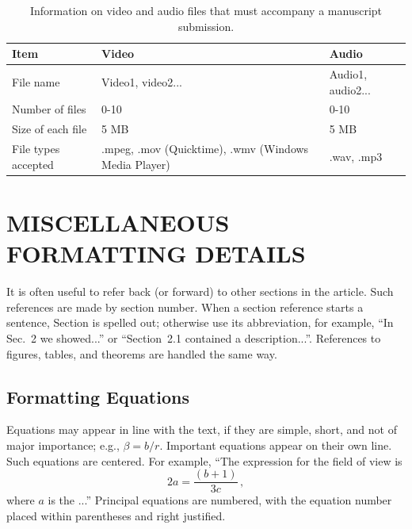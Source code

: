 \documentclass[]{spie}  %
\begin{document}
   \begin{table}[ht]
\caption{Information on video and audio files that must accompany a manuscript submission.} 
\label{tab:Multimedia-Specifications}
\begin{center}       
\begin{tabular}{|l|l|l|}
\hline
\rule[-1ex]{0pt}{3.5ex}  Item & Video & Audio  \\
\hline
\rule[-1ex]{0pt}{3.5ex}  File name & Video1, video2... & Audio1, audio2...   \\
\hline
\rule[-1ex]{0pt}{3.5ex}  Number of files & 0-10 & 0-10  \\
\hline
\rule[-1ex]{0pt}{3.5ex}  Size of each file & 5 MB & 5 MB  \\
\hline
\rule[-1ex]{0pt}{3.5ex}  File types accepted & .mpeg, .mov (Quicktime), .wmv (Windows Media Player) & .wav, .mp3  \\
\hline 
\end{tabular}
\end{center}
\end{table}

\appendix    %

\section{MISCELLANEOUS FORMATTING DETAILS}
\label{sec:misc}

It is often useful to refer back (or forward) to other sections in the article.  Such references are made by section number.  When a section reference starts a sentence, Section is spelled out; otherwise use its abbreviation, for example, ``In Sec.~2 we showed...'' or ``Section~2.1 contained a description...''.  References to figures, tables, and theorems are handled the same way.

\subsection{Formatting Equations}
Equations may appear in line with the text, if they are simple, short, and not of major importance; e.g., $\beta = b/r$.  Important equations appear on their own line.  Such equations are centered.  For example, ``The expression for the field of view is
\begin{equation}
\label{eq:fov}
2 a = \frac{(b + 1)}{3c} \, ,
\end{equation}
where $a$ is the ...'' Principal equations are numbered, with the equation number placed within parentheses and right justified.  
\end{document}
